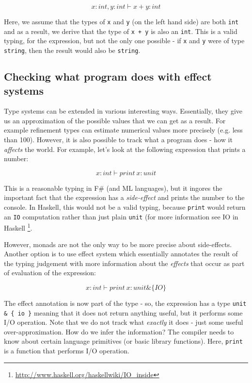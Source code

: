 \begin{equation}
x:int, y:int \vdash x+y : int
\end{equation}

Here, we assume that the types of \texttt{x} and \texttt{y} (on the left hand side) are both \texttt{int} and as a result,
we derive that the type of \texttt{x + y} is also an \texttt{int}. This is a valid typing, for the expression, but
not the only one possible - if \texttt{x} and \texttt{y} were of type \texttt{string}, then the result would also be 
 \texttt{string}.

\subsection{Checking what program does with effect systems}

Type systems can be extended in various interesting ways. Essentially, they give us an approximation
of the possible values that we can get as a result. For example refinement types \cite{xx}
can estimate numerical values more precisely (e.g. less than 100). However, it is also possible to 
track what a program does - how it \emph{affects} the world. For example, let's look at the following
expression that prints a number:

\begin{equation}
x:int \vdash print~x : unit
\end{equation}

This is a reasonable typing in F\# (and ML languages), but it ingores the important fact that the 
expression has a \emph{side-effect} and prints the number to the console. In Haskell, this would not be
a valid typing, because \texttt{print} would return an \texttt{IO} computation rather than just plain \texttt{unit} (for
more information see IO in Haskell \footnote{\url{http://www.haskell.org/haskellwiki/IO_inside}}.

However, monads are not the only way to be more precise about side-effects. Another option is
to use effect system \cite{xx} which essentially annotates the 
result of the typing judgement with more information about the \emph{effects} that occur as part of
evaluation of the expression:

\begin{equation}
x:int \vdash print~x : unit \& \{ IO \}
\end{equation}

The effect annotation is now part of the type - so, the expression has a type \texttt{unit \& \{ io \}} meaning
that it does not return anything useful, but it performs some I/O operation. Note that we do not track
what \emph{exactly} it does - just some useful over-approximation. How do we infer the information?
The compiler needs to know about certain language primitives (or basic library functions). Here, 
\texttt{print} is a function that performs I/O operation.

